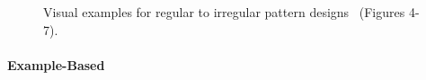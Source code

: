 \begin{figure}[H]
    \centering
    \caption{\label{fig:textures}Visual examples for regular to irregular pattern designs~\cite{gieseke_2014_ipr} (Figures 4-7).}
\end{figure}

\paragraph*{Example-Based}
\label{para:analysis_regular_example}

